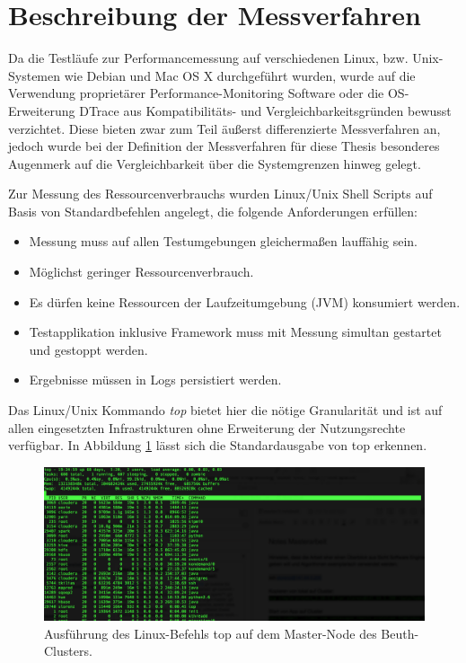 \section{Beschreibung der Messverfahren}
\label{section:messumgebungen}

Da die Testläufe zur Performancemessung auf verschiedenen Linux, bzw. Unix-Systemen wie Debian und Mac OS X durchgeführt wurden, wurde auf die Verwendung proprietärer Performance-Monitoring Software oder die OS-Erweiterung DTrace  aus Kompatibilitäts- und Vergleichbarkeitsgründen bewusst verzichtet. Diese bieten zwar zum Teil äußerst differenzierte Messverfahren an, jedoch wurde bei der Definition der Messverfahren für diese Thesis besonderes Augenmerk auf die Vergleichbarkeit über die Systemgrenzen hinweg gelegt. 

Zur Messung des Ressourcenverbrauchs wurden Linux/Unix Shell Scripts auf Basis von Standardbefehlen angelegt, die folgende Anforderungen erfüllen:

\begin{itemize}
\item Messung muss auf allen Testumgebungen gleichermaßen lauffähig sein.
\item Möglichst geringer Ressourcenverbrauch.
\item Es dürfen keine Ressourcen der Laufzeitumgebung (JVM) konsumiert werden.
\item Testapplikation inklusive Framework muss mit Messung simultan gestartet und gestoppt werden.
\item Ergebnisse müssen in Logs persistiert werden.
\end{itemize}

Das Linux/Unix Kommando \textit{top}  bietet hier die nötige Granularität und ist auf allen eingesetzten Infrastrukturen ohne Erweiterung der Nutzungsrechte verfügbar. In Abbildung \ref{fig:topcluster} lässt sich die Standardausgabe von top erkennen. 

   

\begin{figure}[htb!]
\centering
\includegraphics[width=1.0\textwidth]{bilder/top_cluster.png}
\caption{Ausführung des Linux-Befehls top auf dem Master-Node des Beuth-Clusters.}
\label{fig:topcluster}
\end{figure}    

